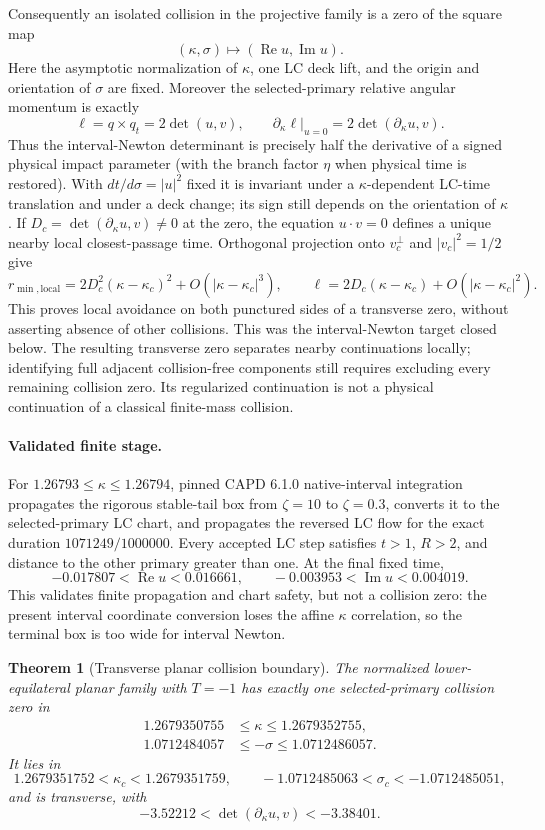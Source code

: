 \documentclass[11pt]{article}
\newtheorem{theorem}{Theorem}
\begin{document}
Consequently an isolated collision in the projective family is a zero of the
square map
\[
 (\kappa,\sigma)\longmapsto
 (\operatorname{Re}u,\operatorname{Im}u).
\]
Here the asymptotic normalization of $\kappa$, one LC deck lift, and the
origin and orientation of $\sigma$ are fixed.
Moreover the selected-primary relative angular momentum is exactly
\[
 \ell=q\times q_t=2\det(u,v),\qquad
 \left.\partial_\kappa\ell\right|_{u=0}
 =2\det(\partial_\kappa u,v).
\]
Thus the interval-Newton determinant is precisely half the derivative of a
signed physical impact parameter (with the branch factor $\eta$ when physical
time is restored). With $dt/d\sigma=|u|^2$ fixed it is invariant under a
$\kappa$-dependent LC-time translation and under a deck change; its sign
still depends on the orientation of $\kappa$.
If $D_c=\det(\partial_\kappa u,v)\ne0$ at the zero, the equation
$u\cdot v=0$ defines a unique nearby local closest-passage time. Orthogonal
projection onto $v_c^\perp$ and $|v_c|^2=1/2$ give
\[
 r_{\min,\mathrm{local}}
 =2D_c^2(\kappa-\kappa_c)^2+O(|\kappa-\kappa_c|^3),
 \qquad
 \ell=2D_c(\kappa-\kappa_c)+O(|\kappa-\kappa_c|^2).
\]
This proves local avoidance on both punctured sides of a transverse zero,
without asserting absence of other collisions.
This was the interval-Newton target closed below. The resulting transverse
zero separates nearby continuations locally; identifying full adjacent
collision-free components still requires excluding every remaining collision
zero. Its regularized
continuation is not a physical continuation of a classical finite-mass
collision.

\paragraph{Validated finite stage.}
For $1.26793\le\kappa\le1.26794$, pinned CAPD 6.1.0 native-interval
integration propagates the rigorous stable-tail box from $\zeta=10$ to
$\zeta=0.3$, converts it to the selected-primary LC chart, and propagates the
reversed LC flow for the exact duration $1071249/1000000$. Every accepted LC
step satisfies $t>1$, $R>2$, and distance to the other primary greater than
one. At the final fixed time,
\[
 -0.017807<\operatorname{Re}u<0.016661,
 \qquad
 -0.003953<\operatorname{Im}u<0.004019.
\]
This validates finite propagation and chart safety, but not a collision zero:
the present interval coordinate conversion loses the affine $\kappa$
correlation, so the terminal box is too wide for interval Newton.

\begin{theorem}[Transverse planar collision boundary]
The normalized lower-equilateral planar family with $T=-1$ has exactly one
selected-primary collision zero in
\[
 \begin{aligned}
  1.2679350755&\le\kappa\le1.2679352755,\\
  1.0712484057&\le-\sigma\le1.0712486057.
 \end{aligned}
\]
It lies in
\[
 1.2679351752<\kappa_c<1.2679351759,
 \qquad
 -1.0712485063<\sigma_c<-1.0712485051,
\]
and is transverse, with
\[
 -3.52212<\det(\partial_\kappa u,v)<-3.38401.
\]
\end{theorem}
\end{document}
